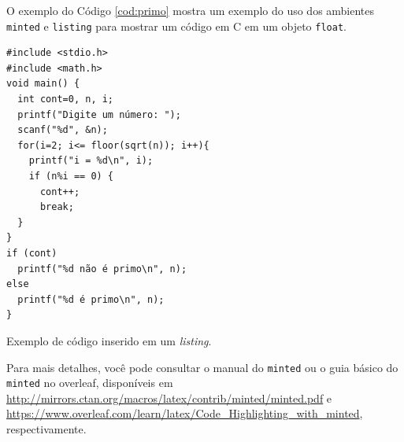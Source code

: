 O exemplo do Código \ref{cod:primo} mostra um exemplo do uso dos ambientes \texttt{minted} e \texttt{listing} para mostrar um código em C em um objeto \texttt{float}.

\begin{listing}[ht]
\begin{verbatim}
#include <stdio.h>
#include <math.h>
void main() {
  int cont=0, n, i;
  printf("Digite um número: ");
  scanf("%d", &n);
  for(i=2; i<= floor(sqrt(n)); i++){
    printf("i = %d\n", i);   
    if (n%i == 0) {
      cont++;
      break;
  }      
} 
if (cont) 
  printf("%d não é primo\n", n);
else
  printf("%d é primo\n", n);
}
\end{verbatim}
\caption{Exemplo de código inserido em um \textit{listing}.}
\label{cod:primo}
\end{listing}

Para mais detalhes, você pode consultar o manual do \texttt{minted} ou o guia básico do \texttt{minted} no \gls{overleaf}, disponíveis em 
\url{http://mirrors.ctan.org/macros/latex/contrib/minted/minted.pdf} \parencite{minted} e
\url{https://www.overleaf.com/learn/latex/Code_Highlighting_with_minted}, respectivamente.

